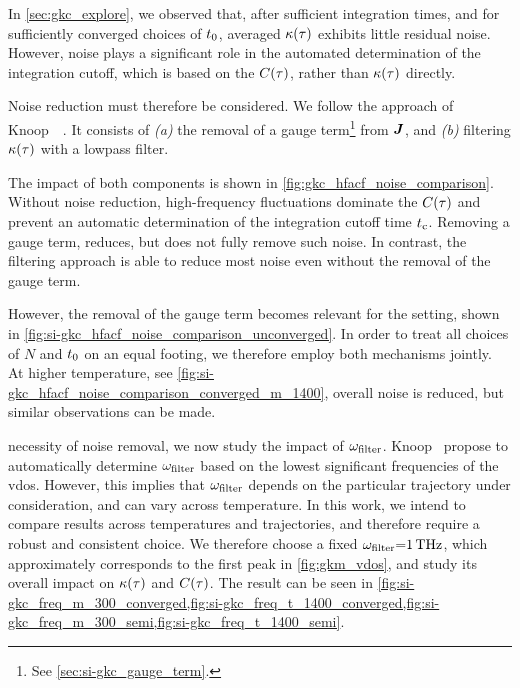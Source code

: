 In \cref{sec:gkc_explore}, we observed that, after sufficient integration times, and for sufficiently converged choices of $t_0$, averaged $\kappa(\tau)$ exhibits little residual noise.
However, noise plays a significant role in the automated determination of the integration cutoff, which is based on the \hfacf $C(\tau)$, rather than $\kappa(\tau)$ directly.

Noise reduction must therefore be considered. We follow the approach of Knoop~\etal~\cite{ksc2023t}.
It consists of \emph{(a)} the removal of a gauge term\footnote{See \cref{sec:si-gkc_gauge_term}.} from $\boldsymbol{J}$, and \emph{(b)} filtering $\kappa(\tau)$ with a lowpass filter.
The impact of both components is shown in \cref{fig:gkc_hfacf_noise_comparison}.
Without noise reduction, high-frequency fluctuations dominate the \hfacf $C(\tau)$ and prevent an automatic determination of the integration cutoff time $t_{\text{c}}$. Removing a gauge term, reduces, but does not fully remove such noise. In contrast, the filtering approach is able to reduce most noise even without the removal of the gauge term.

However, the removal of the gauge term becomes relevant for the  setting, shown in \cref{fig:si-gkc_hfacf_noise_comparison_unconverged}. In order to treat all choices of $N$ and $t_0$ on an equal footing, we therefore employ both mechanisms jointly.
At higher temperature, see \cref{fig:si-gkc_hfacf_noise_comparison_converged_m_1400}, overall noise is reduced, but similar observations can be made.

 necessity of noise removal, we now study the impact of $\omega_{\text{filter}}$. Knoop~\etal{} propose to automatically determine $\omega_{\text{filter}}$ based on the lowest significant frequencies of the \gls{vdos}.
However, this implies that $\omega_{\text{filter}}$ depends on the particular trajectory under consideration, and can vary across temperature. In this work, we intend to compare results across temperatures and trajectories, and therefore require a robust and consistent choice.
We therefore choose a fixed $\omega_{\text{filter}}{=}\qty{1}{THz}$, which approximately corresponds to the first peak in \cref{fig:gkm_vdos}, and study its overall impact on $\kappa(\tau)$ and $C(\tau)$.
The result can be seen in \cref{fig:si-gkc_freq_m_300_converged,fig:si-gkc_freq_t_1400_converged,fig:si-gkc_freq_m_300_semi,fig:si-gkc_freq_t_1400_semi}.

